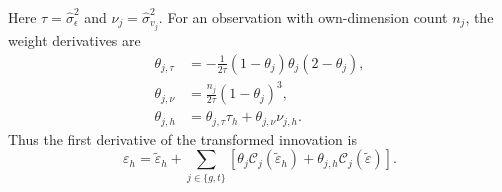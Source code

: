 \documentclass[12pt]{article}
\begin{document}
Here $\tau=\widehat{\sigma}_{\epsilon}^{2}$ and $\nu_j=\widehat{\sigma}_{v_j}^{2}$. For an observation with own-dimension count $n_j$, the weight derivatives are
\begin{align}
\theta_{j,\tau}&=-\frac{1}{2\tau}(1-\theta_j)\theta_j(2-\theta_j),\\
\theta_{j,\nu}&=\frac{n_j}{2\tau}(1-\theta_j)^3,\\
\theta_{j,h}&=\theta_{j,\tau}\tau_h+\theta_{j,\nu}\nu_{j,h}.
\label{eq:re-two-way-theta-first}
\end{align}
Thus the first derivative of the transformed innovation is
\begin{equation}
\varepsilon_{h}=\tilde{\varepsilon}_h+\sum_{j\in\{g,t\}}\left[\theta_j\mathcal C_j(\tilde{\varepsilon}_h)+\theta_{j,h}\mathcal C_j(\tilde{\varepsilon})\right].
\label{eq:re-two-way-first}
\end{equation}
\end{document}
